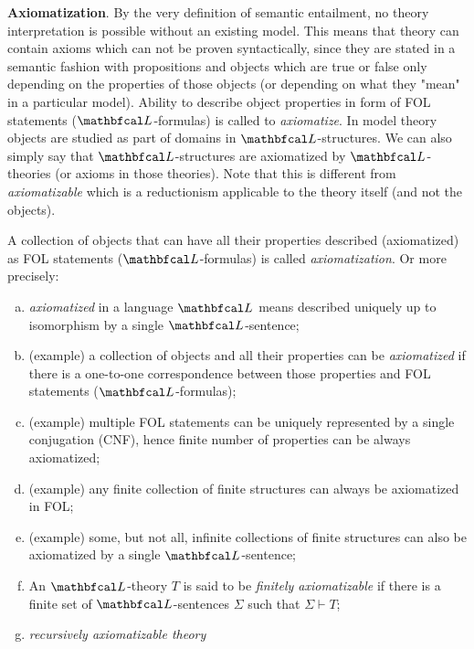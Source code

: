 \textbf{Axiomatization}. By the very definition of semantic entailment, no theory interpretation is possible without an existing model. This means that theory can contain axioms which can not be proven syntactically, since they are stated in a semantic fashion with propositions and objects which are true or false only depending on the properties of those objects (or depending on what they "mean" in a particular model). Ability to describe object properties in form of FOL statements ($\lsign$-formulas) is called to \textit{axiomatize}. In model theory objects are studied as part of domains in $\lsign$-structures. We can also simply say that $\lsign$-structures are axiomatized by $\lsign$-theories (or axioms in those theories). Note that this is different from \textit{axiomatizable} which is a reductionism applicable to the theory itself (and not the objects).

\begin{definition} 
A collection of objects that can have all their properties described (axiomatized) as FOL statements ($\lsign$-formulas) is called \textit{axiomatization}. Or more precisely:
\begin{enumerate}[(a)]
  \item \textit{axiomatized} in a language $\lsign$ means described uniquely up to isomorphism by a single $\lsign$-sentence;
    \item (example) a collection of objects and all their properties can be \textit{axiomatized} if there is a one-to-one correspondence between those properties and FOL statements ($\lsign$-formulas);
    \item (example) multiple FOL statements can be uniquely represented by a single conjugation (CNF), hence finite number of properties can be always axiomatized;
    \item (example) any finite collection of finite structures can always be axiomatized in FOL; 
    \item (example) some, but not all, infinite collections of finite structures can also be axiomatized by a single $\lsign$-sentence;
    \item An $\lsign$-theory $T$ is said to be \textit{finitely axiomatizable} if there is a finite set of $\lsign$-sentences $\Sigma$ such that $\Sigma \vdash T$;
    \item \textit{recursively axiomatizable theory}
\end{enumerate}
\end{definition}

